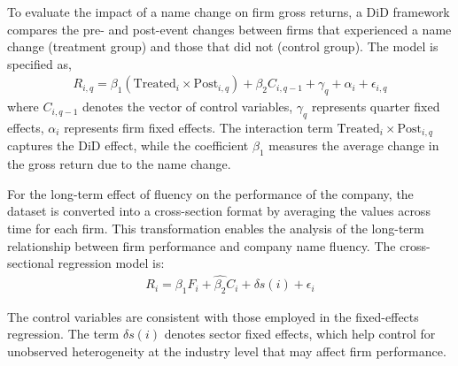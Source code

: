 \documentclass[a4paper,11pt]{report}
\begin{document}
To evaluate the impact of a name change on firm gross returns, a DiD framework compares the pre- and post-event changes between firms that experienced a name change (treatment group) and those that did not (control group). The model is specified as,
\begin{align}
    R_{i,q} = \beta_1 \left(\text{Treated}_i \times \text{Post}_{i,q}\right) 
    + \beta_2 C_{i,q-1} + \gamma_q + \alpha_i + \epsilon_{i,q}
\end{align}
where $C_{i,q-1}$ denotes the vector of control variables, $\gamma_q$ represents quarter fixed effects, $\alpha_i$ represents firm fixed effects. The interaction term $\text{Treated}_i \times \text{Post}_{i,q}$ captures the DiD effect, while the coefficient $\beta_1$ measures the average change in the gross return due to the name change.
\begin{comment}
To understand the short-term effects of change in company name, an event study is used. The event window spans four quarters before and after the name change (i.e., from t $= -4$ to t = $= +4$), capturing any pre-event or post-event effect over a two-year period. The event study is structured as following, 
\begin{align}
    R_{i,q}  = \sum_{k=-4}^{4} \eta_k \cdot \text{REL}_{i,q}^{(k)} + {\beta_2}C_{i,q-1} +
               \gamma_q + \alpha_i + \epsilon_{i,q}
\end{align}
The control variables are same as the fixed-effect regression for performance. $\text{REL}_{i,q}^{(k)}$ is the dummy variable of the relative quarter $k$ from the event and $\eta_k$ capture the effect of the name change in each event-time quarter. $\gamma_q$ and $\alpha_i$
represent quarter and firm fixed effects, respectively. 
\end{comment}
For the long-term effect of fluency on the performance of the company, the dataset is converted into a cross-section format by averaging the values across time for each firm. This transformation enables the analysis of the long-term relationship between firm performance and company name fluency. The cross-sectional regression model is:
\begin{align}
    R_{i} = \beta_1 F_{i} + \hat{\beta_2} C_{i} + \delta{s(i)} + \epsilon_{i}
\end{align}

The control variables are consistent with those employed in the fixed-effects regression. The term $\delta{s(i)}$ denotes sector fixed effects, which help control for unobserved heterogeneity at the industry level that may affect firm performance. 
\end{document}
